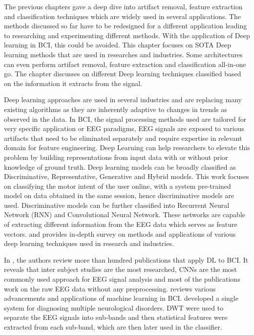 The previous chapters gave a deep dive into artifact removal, feature extraction and classification techniques which are widely used in several applications. The methods discussed so far have to be redesigned for a different application leading to researching and experimenting different methods. With the application of Deep learning in BCI, this could be avoided. This chapter focuses on SOTA Deep learning methods that are used in researches and industries. Some architectures can even perform artifact removal, feature extraction and classification all-in-one go. The chapter discusses on different Deep learning techniques classified based on the information it extracts from the signal.

Deep learning approaches are used in several industries and are replacing many existing algorithms as they are inherently adaptive to changes in trends as observed in the data. In BCI, the signal processing methods used are tailored for very specific application or EEG paradigms, EEG signals are exposed to various artifacts that need to be eliminated separately and require expertise in relevant domain for feature engineering. Deep Learning  can help researchers to elevate this problem by building representations from input data with or without prior knowledge of ground truth. Deep learning models can be broadly classified as Discriminative, Representative, Generative and Hybrid models. This work focuses on classifying the motor intent of the user online, with a system pre-trained model on data obtained in the same session, hence discriminative models are used. Discriminative models can be further classified into Recurrent Neural Network (RNN) and Convolutional Neural Network. These networks are capable of extracting different information from the EEG data which serves as feature vectors. \cite{2020_Survey_DL_BCI} and \cite{2021_Book_Deep_Learning_EEG} provides in-depth survey on methods and applications of various deep learning techniques used in research and industries. 

In \cite{2019_EEG_analysis_DNN}, the authors review more than hundred publications that apply DL to BCI. It reveals that inter subject studies are the most researched, CNNs are the most commonly used approach for EEG signal analysis and most of the publications work on the raw EEG data without any preprocessing. \cite{2021_ML_BCI_review} reviews various advancements and applications of machine learning in BCI. \cite{2020_EEG_WaveletTrans_ANN} developed a single system for diagnosing multiple neurological disorders. DWT were used to separate the EEG signals into sub-bands and then statistical features were extracted from each sub-band, which are then later used in the classifier.

